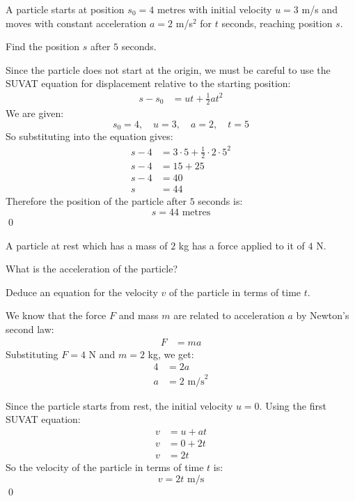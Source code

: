 \begin{example}
A particle starts at position $s_0 = 4$ metres with initial velocity $u = 3$ m/s and moves with constant acceleration $a = 2$ m/s$^2$ for $t$ seconds, reaching position $s$.

Find the position $s$ after $5$ seconds.

\end{example}
\begin{solution}
Since the particle does not start at the origin, we must be careful to use the SUVAT equation for displacement relative to the starting position:
\begin{align*}
    s - s_0 &= ut + \frac{1}{2}at^2
\end{align*}
We are given:
\[
s_0 = 4,\quad u = 3,\quad a = 2,\quad t = 5
\]
So substituting into the equation gives:
\begin{align*}
    s - 4 &= 3 \cdot 5 + \frac{1}{2}\cdot 2 \cdot 5^2 \\
    s - 4 &= 15 + 25 \\
    s - 4 &= 40 \\
    s &= 44
\end{align*}
Therefore the position of the particle after $5$ seconds is:
\[
s = 44 \text{ metres}
\]
\qed
\end{solution}

\begin{example}
    A particle at rest which has a mass of $2$ kg has a force applied to it of $4$ N. 

    What is the acceleration of the particle?

    Deduce an equation for the velocity $v$ of the particle in terms of time $t$.
\end{example}
\begin{solution}
We know that the force $F$ and mass $m$ are related to acceleration $a$ by Newton's second law:
\begin{align*}
    F &= ma
\end{align*}
Substituting $F = 4$ N and $m = 2$ kg, we get:
\begin{align*}
    4 &= 2a \\
    a &= 2 \text{ m/s}^2
\end{align*}

Since the particle starts from rest, the initial velocity $u = 0$. Using the first SUVAT equation:
\begin{align*}
    v &= u + at \\
    v &= 0 + 2t \\
    v &= 2t
\end{align*}
So the velocity of the particle in terms of time $t$ is:
\[
v = 2t \text{ m/s}
\]
\qed
\end{solution}

